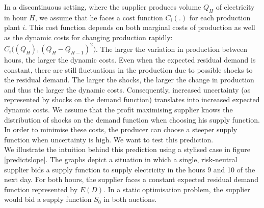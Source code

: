In a discontinuous setting, where the supplier produces volume $Q_H$ of electricity in hour $H$, we assume that he faces a cost function $C_i(.)$ for each production plant $i$. This cost function depends on both marginal costs of production as well as the dynamic costs for changing production rapidly: $C_i \bigl( (Q_H), (Q_H - Q_{H-1})^2 \bigr)$. The larger the variation in production between hours, the larger the dynamic costs. 
Even when the expected residual demand is constant, there are still fluctuations in the production due to possible shocks to the residual demand. The larger the shocks, the larger the change in production and thus the larger the dynamic costs. 
Consequently, increased uncertainty (as represented by shocks on the demand function) translates into increased expected dynamic costs. We assume that the profit maximising supplier knows the distribution of shocks on the demand function when choosing his supply function.  In order to minimise these costs, the producer can choose a steeper supply function when uncertainty is high. We want to test this prediction. \\

We illustrate the intuition behind this prediction using a stylised case in figure \ref{predictslope}. The graphs depict a situation in which a single, risk-neutral supplier bids a supply function to supply electricity in the hours 9 and 10 of the next day. For both hours, the supplier faces a constant expected residual demand function represented by $E(D)$. In a static optimisation problem, the supplier would bid a supply function $S_0$ in both auctions. \\

